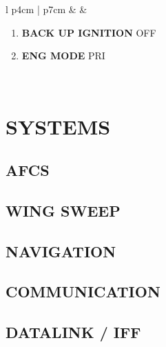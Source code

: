 \documentclass[8pt,usenames,dvipsnames,twoside]{article}
\begin{document}
\begin{center}
\begin{longtable}{l p{4cm} | p{7cm}}
				\midrule
				\textbullet &  &
				\begin{minipage}[t]{\linewidth}
					\vspace{-7pt}
					\begin{enumerate}[label=(\alph*)]
						\item \textbf{BACK UP IGNITION} \dotfill OFF
						\item \textbf{ENG MODE} \dotfill PRI
					\end{enumerate}
				\end{minipage} \\
				\bottomrule
			\end{longtable}
		\end{center}
	
		\cleardoublepage
		
		\section{SYSTEMS}
		
		\subsection{AFCS}
		\subsection{WING SWEEP}
		\subsection{NAVIGATION}
		\subsection{COMMUNICATION}
		\subsection{DATALINK / IFF}
		
		\clearpage
\end{document}
